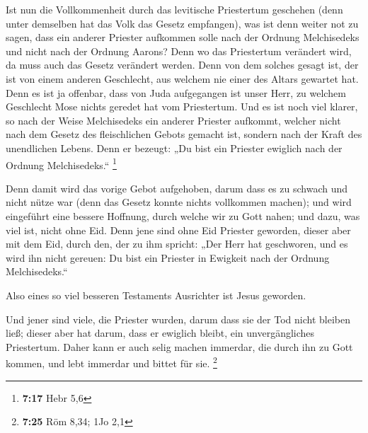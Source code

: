  Ist nun die Vollkommenheit durch das levitische
Priestertum geschehen (denn unter demselben hat das Volk das Gesetz
empfangen), was ist denn weiter not zu sagen, dass ein anderer Priester
aufkommen solle nach der Ordnung Melchisedeks und nicht nach der Ordnung
Aarons?  Denn wo das Priestertum verändert wird, da muss
auch das Gesetz verändert werden.  Denn von dem solches
gesagt ist, der ist von einem anderen Geschlecht, aus welchem nie einer
des Altars gewartet hat.  Denn es ist ja offenbar, dass
von Juda aufgegangen ist unser Herr, zu welchem Geschlecht Mose nichts
geredet hat vom Priestertum.  Und es ist noch viel
klarer, so nach der Weise Melchisedeks ein anderer Priester aufkommt,
 welcher nicht nach dem Gesetz des fleischlichen Gebots
gemacht ist, sondern nach der Kraft des unendlichen Lebens.
 Denn er bezeugt: „Du bist ein Priester ewiglich nach der
Ordnung Melchisedeks.`` \footnote{\textbf{7:17} Hebr 5,6}

 Denn damit wird das vorige Gebot aufgehoben, darum dass
es zu schwach und nicht nütze war  (denn das Gesetz
konnte nichts vollkommen machen); und wird eingeführt eine bessere
Hoffnung, durch welche wir zu Gott nahen;  und dazu, was
viel ist, nicht ohne Eid. Denn jene sind ohne Eid Priester geworden,
 dieser aber mit dem Eid, durch den, der zu ihm spricht:
„Der Herr hat geschworen, und es wird ihn nicht gereuen: Du bist ein
Priester in Ewigkeit nach der Ordnung Melchisedeks.``

 Also eines so viel besseren Testaments Ausrichter ist
Jesus geworden.

 Und jener sind viele, die Priester wurden, darum dass
sie der Tod nicht bleiben ließ;  dieser aber hat darum,
dass er ewiglich bleibt, ein unvergängliches Priestertum.
 Daher kann er auch selig machen immerdar, die durch ihn
zu Gott kommen, und lebt immerdar und bittet für sie. \footnote{\textbf{7:25}
  Röm 8,34; 1Jo 2,1}

